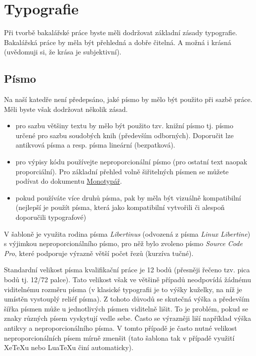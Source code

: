 \chapter{Typografie}

Při tvorbě bakalářské práce byste měli dodržovat základní zásady typografie. Bakalářská práce by měla být přehledná a dobře čitelná. A možná i krásná (uvědomuji si, že krása je subjektivní).

\section{Písmo}

Na naší katedře není předepsáno, jaké písmo by mělo být použito při sazbě práce. Měli byste však dodržovat několik zásad.

\begin{itemize}
\item pro sazbu většiny textu by mělo být použito tzv. knižní písmo tj. písmo určené
pro sazbu soudobých knih (především odborných). Doporučit lze antikvová písma a resp. písma lineární (bezpatková).
\item pro výpisy kódu používejte neproporcionální písmo (pro ostatní text naopak proporciální). Pro základní přehled 
volně šiřitelných písmen se můžete podívat do dokumentu \href{https://github.com/Jiri-Fiser/thesis_ki_ujep/blob/main/monotyp%C3%A1%C5%99.pdf}{Monotypář}.
\item pokud používáte více druhů písma, pak by měla být vizuálně kompatibilní (nejlepší je použít písma, která jako kompatibilní vytvořili či alespoň doporučili typografové)
\end{itemize}

V šabloně je využita rodina písma \textit{Libertinus} (odvozená z písma \textit{Linux Libertine}) s výjimkou neproporcionálního písmo, pro něž bylo zvoleno písmo \textit{Source Code Pro}, které podporuje výrazně větší počet řezů (kurzíva tučné).

Standardní velikost písma kvalifikační práce je 12 bodů (přesněji řečeno tzv. pica bodů tj. 12/72 palce). Tato velikost však ve většině případů neodpovídá žádnému viditelnému rozměru písma (v klasické typografii je to výšky kuželky, na níž je umístěn vystouplý reliéf písma). Z  tohoto důvodů se skutečná výška a především šířka písmen může u jednotlivých písmen viditelně lišit. To je problém, pokud se znaky různých písem vyskytují vedle sebe. Často se výrazněji liší například výška antikvy a  neproporcionálního písma. V tomto případě je často nutné velikost neproporcionálních písem mírně zmenšit (tato šablona tak v případě využití XeTeXu nebo LuaTeXu činí automaticky).


